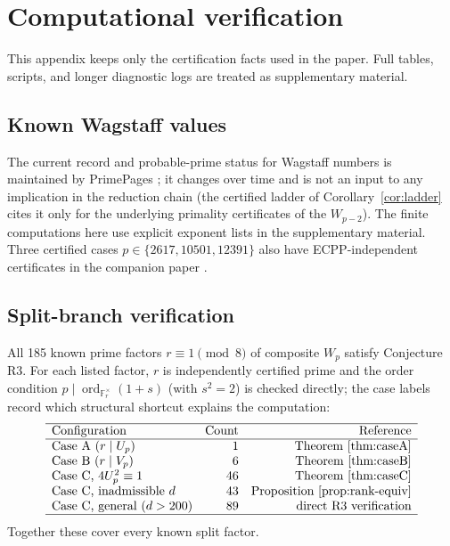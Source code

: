\documentclass[11pt]{amsart}
\theoremstyle{plain}
\theoremstyle{definition}
\theoremstyle{remark}
\numberwithin{equation}{section}
\newcommand{\ord}{\operatorname{ord}}
\newcommand{\F}{\mathbb{F}}
\begin{document}
\section{Computational verification}\label{sec:computational}

This appendix keeps only the certification facts used in the paper. Full tables, scripts, and longer diagnostic logs are treated as supplementary material.

\subsection{Known Wagstaff values}

The current record and probable-prime status for Wagstaff numbers is maintained by PrimePages \cite{ref:PrimePagesWagstaff}; it changes over time and is not an input to any implication in the reduction chain (the certified ladder of Corollary~\ref{cor:ladder} cites it only for the underlying primality certificates of the $W_{p-2}$). The finite computations here use explicit exponent lists in the supplementary material. Three certified cases $p\in\{2617,10501,12391\}$ also have ECPP-independent certificates in the companion paper \cite{ref:A}.

\subsection{Split-branch verification}\label{sec:R3-verify}

All 185 known prime factors $r\equiv1\pmod8$ of composite $W_p$ satisfy Conjecture R3. For each listed factor, $r$ is independently certified prime and the order condition $p\mid\ord_{\F_r^\times}(1+s)$ (with $s^2=2$) is checked directly; the case labels record which structural shortcut explains the computation:
\[
\begin{array}{lrr}
\hline
\text{Configuration} & \text{Count} & \text{Reference}\\
\hline
\text{Case A }(r\mid U_p) & 1 & \text{Theorem~\ref{thm:caseA}}\\
\text{Case B }(r\mid V_p) & 6 & \text{Theorem~\ref{thm:caseB}}\\
\text{Case C, }4U_p^2\equiv1 & 46 & \text{Theorem~\ref{thm:caseC}}\\
\text{Case C, inadmissible }d & 43 & \text{Proposition~\ref{prop:rank-equiv}}\\
\text{Case C, general }(d>200) & 89 & \text{direct R3 verification}\\
\hline
\end{array}
\]
Together these cover every known split factor.
\end{document}
